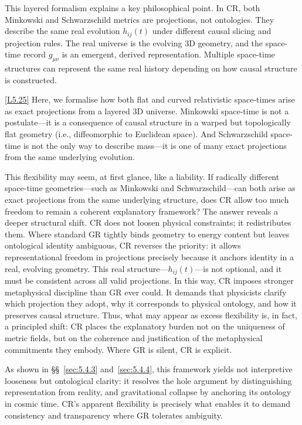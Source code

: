 \documentclass[12pt]{book}
\newcounter{logicanchor}
\newenvironment{logicanchorenv}[1]{\refstepcounter{logicanchor}\label{#1}}{}
\newcommand{\logiclink}[2]{\begin{logicanchorenv}{logic:#1}\end{logicanchorenv}\hyperref[appendix:#1]{[#1]}\xspace}
\begin{document}
This layered formalism explains a key philosophical point. In CR, both Minkowski and Schwarzschild metrics are projections, not ontologies. They describe the same real evolution $h_{ij}(t)$ under different causal slicing and projection rules. The real universe is the evolving 3D geometry, and the space-time record $g_{\mu\nu}$ is an emergent, derived representation. Multiple space-time structures can represent the same real history depending on how causal structure is constructed.

\logiclink{L5.25}{} Here, we formalise how both flat and curved relativistic space-times arise as exact projections from a layered 3D universe. Minkowski space-time is not a postulate---it is a consequence of causal structure in a warped but topologically flat geometry (i.e., diffeomorphic to Euclidean space). And Schwarzschild space-time is not the only way to describe mass---it is one of many exact projections from the same underlying evolution.

This flexibility may seem, at first glance, like a liability. If radically different space-time geometries---such as Minkowski and Schwarzschild---can both arise as exact projections from the same underlying structure, does CR allow too much freedom to remain a coherent explanatory framework? The answer reveals a deeper structural shift. CR does not loosen physical constraints; it redistributes them. Where standard GR tightly binds geometry to energy content but leaves ontological identity ambiguous, CR reverses the priority: it allows representational freedom in projections precisely because it anchors identity in a real, evolving geometry. This real structure---$h_{ij}(t)$---is not optional, and it must be consistent across all valid projections. In this way, CR imposes stronger metaphysical discipline than GR ever could. It demands that physicists clarify which projection they adopt, why it corresponds to physical ontology, and how it preserves causal structure. Thus, what may appear as excess flexibility is, in fact, a principled shift: CR places the explanatory burden not on the uniqueness of metric fields, but on the coherence and justification of the metaphysical commitments they embody. Where GR is silent, CR is explicit.

As shown in \S\S~\ref{sec:5.4.3} and~\ref{sec:5.4.4}, this framework yields not interpretive looseness but ontological clarity: it resolves the hole argument by distinguishing representation from reality, and gravitational collapse by anchoring its ontology in cosmic time. CR's apparent flexibility is precisely what enables it to demand consistency and transparency where GR tolerates ambiguity.
\end{document}
